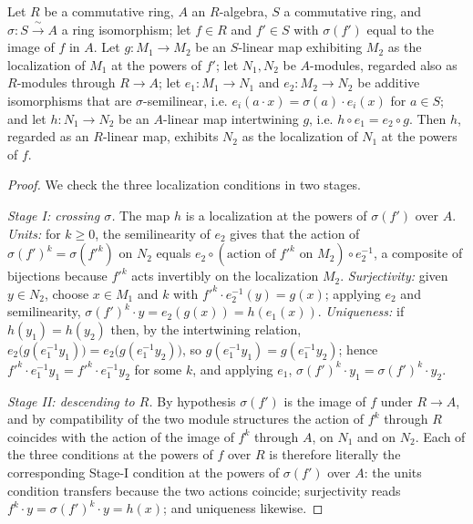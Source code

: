 \begin{lemma}
  \label{lem:isLocalizedModule_powers_transport}
  \leanok
  Let \(R\) be a commutative ring, \(A\) an \(R\)-algebra, \(S\) a commutative ring, and
  \(\sigma : S \xrightarrow{\ \sim\ } A\) a ring isomorphism; let \(f \in R\) and
  \(f' \in S\) with \(\sigma(f')\) equal to the image of \(f\) in \(A\). Let
  \(g : M_1 \to M_2\) be an \(S\)-linear map exhibiting \(M_2\) as the localization of
  \(M_1\) at the powers of \(f'\); let \(N_1, N_2\) be \(A\)-modules, regarded also as
  \(R\)-modules through \(R \to A\); let \(e_1 : M_1 \to N_1\) and \(e_2 : M_2 \to N_2\)
  be additive isomorphisms that are \(\sigma\)-semilinear, i.e.
  \(e_i(a \cdot x) = \sigma(a) \cdot e_i(x)\) for \(a \in S\); and let
  \(h : N_1 \to N_2\) be an \(A\)-linear map intertwining \(g\), i.e.
  \(h \circ e_1 = e_2 \circ g\). Then \(h\), regarded as an \(R\)-linear map, exhibits
  \(N_2\) as the localization of \(N_1\) at the powers of \(f\).
\end{lemma}
\begin{proof}
  \leanok
  We check the three localization conditions in two stages.

  \emph{Stage I: crossing \(\sigma\).} The map \(h\) is a localization at the powers of
  \(\sigma(f')\) over \(A\).
  \emph{Units:} for \(k \ge 0\), the semilinearity of \(e_2\) gives that the action of
  \(\sigma(f')^k = \sigma(f'^k)\) on \(N_2\) equals
  \(e_2 \circ (\text{action of } f'^k \text{ on } M_2) \circ e_2^{-1}\), a composite of
  bijections because \(f'^k\) acts invertibly on the localization \(M_2\).
  \emph{Surjectivity:} given \(y \in N_2\), choose \(x \in M_1\) and \(k\) with
  \(f'^k \cdot e_2^{-1}(y) = g(x)\); applying \(e_2\) and semilinearity,
  \(\sigma(f')^k \cdot y = e_2(g(x)) = h(e_1(x))\).
  \emph{Uniqueness:} if \(h(y_1) = h(y_2)\) then, by the intertwining relation,
  \(e_2\bigl(g(e_1^{-1} y_1)\bigr) = e_2\bigl(g(e_1^{-1} y_2)\bigr)\), so
  \(g(e_1^{-1} y_1) = g(e_1^{-1} y_2)\); hence
  \(f'^k \cdot e_1^{-1} y_1 = f'^k \cdot e_1^{-1} y_2\) for some \(k\), and applying
  \(e_1\), \(\sigma(f')^k \cdot y_1 = \sigma(f')^k \cdot y_2\).

  \emph{Stage II: descending to \(R\).} By hypothesis \(\sigma(f')\) is the image of
  \(f\) under \(R \to A\), and by compatibility of the two module structures the action
  of \(f^k\) through \(R\) coincides with the action of the image of \(f^k\) through
  \(A\), on \(N_1\) and on \(N_2\). Each of the three conditions at the powers of \(f\)
  over \(R\) is therefore literally the corresponding Stage-I condition at the powers of
  \(\sigma(f')\) over \(A\): the units condition transfers because the two actions
  coincide; surjectivity reads \(f^k \cdot y = \sigma(f')^k \cdot y = h(x)\); and
  uniqueness likewise.
\end{proof}

